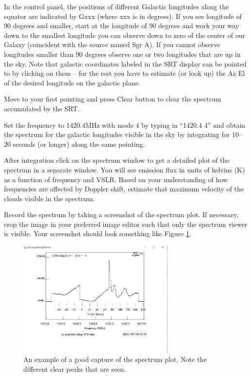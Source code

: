 \begin{steps}
	\item In the control panel, the positions of different Galactic longitudes along
	the equator are indicated by Gxxx (where xxx is in degrees). If you see
	longitude of 90 degrees and smaller, start at the longitude of 90
	degrees and work your way down to the smallest longitude you can
	observe down to zero of the center of our Galaxy (coincident with the
	source named Sgr A). If you cannot observe longitudes smaller than
	90 degrees observe one or two longitudes that are up in the sky. Note
	that galactic coordinates labeled in the SRT display can be pointed to
	by clicking on them – for the rest you have to estimate (or look up) the
	Az El of the desired longitude on the galactic plane. %
	
	\item Move to your first pointing and press Clear button to clear the spectrum accumulated by the SRT.
	
	\item  Set the frequency to 1420.4MHz with mode  4 by typing in ``1420.4 4'' and obtain the spectrum for the galactic longitudes visible in the sky by integrating for 10--20 seconds (or longer) along the same pointing.
	
	\item After integration click on the spectrum window to get a detailed plot of
	the spectrum in a separate window. You will see emission flux in units of kelvins (K) as a
	function of frequency and VSLR. Based on your understanding of how frequencies are affected by Doppler shift, estimate that maximum velocity of the clouds visible in the spectrum. 
	
	\item Record the spectrum by taking a screenshot of the spectrum plot. If necessary, crop the image in your preferred image editor such that only the spectrum viewer is visible. Your screenshot should look something like Figure \ref{sgr:fig:spec-example}.
\end{steps}%
\begin{figure}
	\centering
	\includegraphics[width = 0.7\textwidth]{srt-galaxy-rotation/spectrum_ex}
	\caption{An example of a good capture of the spectrum plot. Note the different clear peaks that are seen.} 
	\label{sgr:fig:spec-example}
\end{figure}%

